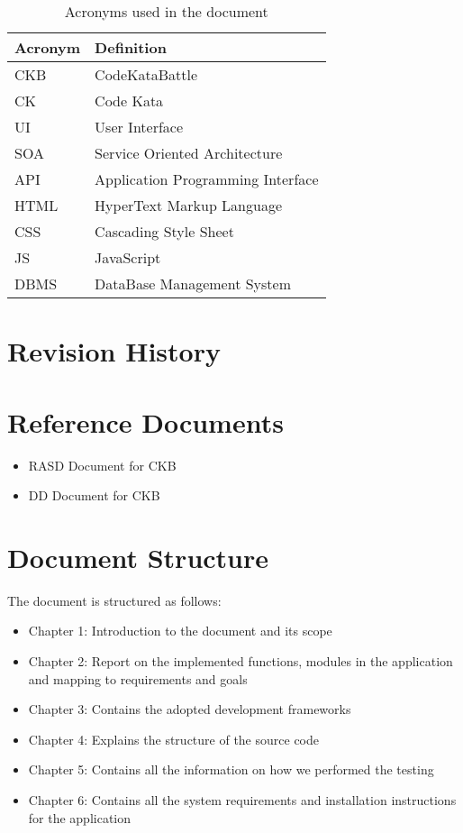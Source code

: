 \begin{table}[H]
    \begin{center}
        \begin{tabular}{|l|l|}
            \hline
            \textbf{Acronym} & \textbf{Definition}\\
            \hline
            CKB & CodeKataBattle\\
            \hline
            CK & Code Kata\\
            \hline
            UI & User Interface\\
            \hline
            SOA & Service Oriented Architecture \\
            \hline
            API & Application Programming Interface \\
            \hline
            HTML & HyperText Markup Language\\
            \hline
            CSS & Cascading Style Sheet\\
            \hline
            JS & JavaScript\\
            \hline
            DBMS & DataBase Management System\\
            \hline
        \end{tabular}
        \caption{Acronyms used in the document}
    \end{center}
\end{table}

\section{Revision History}

\section{Reference Documents}

\begin{itemize}
    \item RASD Document for \ac{CKB}
    \item DD Document for \ac{CKB}
\end{itemize}

\section{Document Structure}
The document is structured as follows: 
\begin{itemize}
    \item Chapter 1: Introduction to the document and its scope
    \item Chapter 2: Report on the implemented functions, modules in the application and mapping to requirements and goals
    \item Chapter 3: Contains the adopted development frameworks
    \item Chapter 4: Explains the structure of the source code
    \item Chapter 5: Contains all the information on how we performed the testing
    \item Chapter 6: Contains all the system requirements and installation instructions for the application
\end{itemize}
